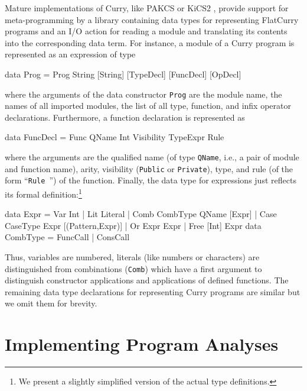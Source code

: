 \documentclass{llncs}
\newcommand{\code}[1]{\mbox{\small\texttt{#1}}}
\newcommand{\ccode}[1]{``\code{#1}''}
\begin{document}
Mature implementations of Curry, like PAKCS \cite{Hanus13PAKCS}
or KiCS2 \cite{BrasselHanusPeemoellerReck11}, provide support
for meta-programming by a library containing data types
for representing FlatCurry programs
and an I/O action for reading a module and translating
its contents into the corresponding data term.
For instance, a module of a Curry program
is represented as an expression of type
\begin{curry}
data Prog = Prog String [String] [TypeDecl] [FuncDecl] [OpDecl]
\end{curry}
where the arguments of the data constructor \code{Prog}
are the module name, the names of all imported modules,
the list of all type, function, and infix operator declarations.
Furthermore, a function declaration is represented as
\begin{curry}
data FuncDecl = Func QName Int Visibility TypeExpr Rule
\end{curry}
where the arguments are the qualified name
(of type \code{QName}, i.e., a pair of module and function name),
arity, visibility (\code{Public} or \code{Private}), type, and rule
(of the form \ccode{Rule  })
of the function.
Finally, the data type for expressions just reflects its
formal definition:\footnote{We present a slightly simplified version
of the actual type definitions.}
\begin{curry}
data Expr = Var Int
          | Lit Literal
          | Comb CombType QName [Expr]
          | Case CaseType Expr [(Pattern,Expr)]
          | Or Expr Expr
          | Free [Int] Expr
data CombType = FuncCall | ConsCall
\end{curry}
Thus, variables are numbered, literals (like numbers or characters)
are distinguished from combinations (\code{Comb}) which
have a first argument to distinguish constructor applications
and applications of defined functions.
The remaining data type declarations for representing Curry programs
are similar but we omit them for brevity.


\section{Implementing Program Analyses}
\label{sec:anaimpl}
\end{document}
